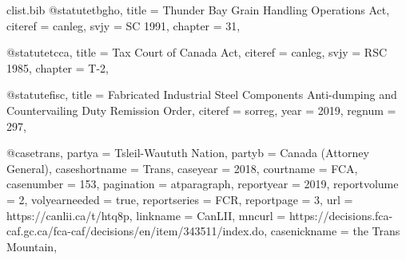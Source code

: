 \begin{filecontents*}[overwrite]{clist\jobname.bib}
@statute{tbgho,	title =  {Thunder Bay Grain Handling Operations Act},	citeref =  {canleg},	svjy =  {SC 1991},	chapter =  {31},											}

@statute{tcca,	title =  {Tax Court of Canada Act},	citeref =  {canleg},	svjy =  {RSC 1985},	chapter =  {T-2},											}

@statute{fisc,	title =  {Fabricated Industrial Steel Components Anti-dumping and Countervailing Duty Remission Order},	citeref =  {sorreg},			year =  {2019},	regnum =  {297},									}

@case{trans,	partya =  {Tsleil-Waututh Nation},	partyb =  {Canada (Attorney General)},	caseshortname =  {Trans},	caseyear =  {2018},	courtname =  {FCA},	casenumber =  {153},	pagination =  {atparagraph},	reportyear =  {2019},	reportvolume =  {2},	volyearneeded =  {true},	reportseries =  {FCR},	reportpage =  {3},	url =  {https://canlii.ca/t/htq8p},	linkname =  {CanLII},	mncurl =  {https://decisions.fca-caf.gc.ca/fca-caf/decisions/en/item/343511/index.do},								casenickname =  {the Trans Mountain},		}


\end{filecontents*}
